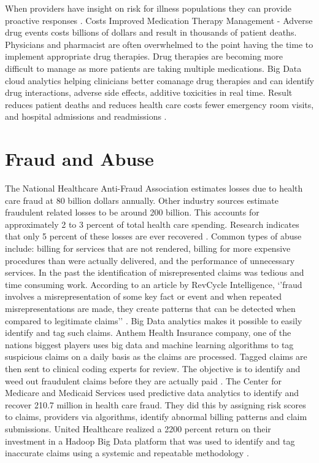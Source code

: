 \documentclass[sigconf]{acmart}
\begin{document}
When providers have insight on risk for illness populations they can provide proactive responses \cite{www-google-christian}. 
\Drug Costs
Improved Medication Therapy Management - Adverse drug events costs billions of dollars and result in thousands of patient deaths.  Physicians and pharmacist are often overwhelmed to the point having the time to implement appropriate drug therapies. Drug therapies are becoming more difficult to manage as more patients are taking multiple medications.  Big Data cloud analytics helping clinicians better comanage drug therapies and can identify drug interactions, adverse side effects, additive toxicities in real time. Result reduces patient deaths and reduces health care costs fewer emergency room visits, and hospital admissions and readmissions \cite{datafloq}.
\section{Fraud and Abuse}
The National Healthcare Anti-Fraud Association estimates losses due to health care fraud at 80 billion dollars annually. Other industry sources estimate fraudulent related losses to be around 200 billion. This accounts for approximately 2 to 3 percent of total health care spending. Research indicates that only 5 percent of these losses are ever recovered \cite{www-google-datameer}.
Common types of abuse include: billing for services that are not rendered, billing for more expensive procedures than were actually delivered, and the performance of unnecessary services. 
In the past the identification of misrepresented claims was tedious and time consuming work.  According to an article by RevCycle Intelligence, ‘’fraud involves a misrepresentation of some key fact or event and when repeated misrepresentations are made, they create patterns that can be detected when compared to legitimate claims’’ \cite{www-google-datameer}.  Big Data analytics makes it possible to easily identify and tag such claims. Anthem Health Insurance company, one of the nations biggest players uses big data and machine learning algorithms to tag suspicious claims on a daily basis as the claims are processed. Tagged claims are then sent to clinical coding experts for review. The objective is to identify and weed out fraudulent claims before they are actually paid \cite{www-google-datameer}.   
The Center for Medicare and Medicaid Services used predictive data analytics to identify and recover 210.7 million in health care fraud. They did this by assigning risk scores to claims, providers via algorithms, identify abnormal billing patterns and claim submissions.  United Healthcare realized a 2200 percent return on their investment in a Hadoop Big Data platform that was used to identify and tag inaccurate claims using a systemic and repeatable methodology \cite{www-google-McDonald}.
\end{document}
